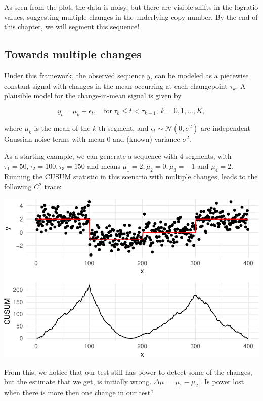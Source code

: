 \documentclass[
  letterpaper,
  DIV=11,
  numbers=noendperiod]{scrreprt}
\begin{document}
As seen from the plot, the data is noisy, but there are visible shifts
in the logratio values, suggesting multiple changes in the underlying
copy number. By the end of this chapter, we will segment this sequence!

\subsection{Towards multiple changes}\label{towards-multiple-changes}

Under this framework, the observed sequence \(y_t\) can be modeled as a
piecewise constant signal with changes in the mean occurring at each
changepoint \(\tau_k\). A plausible model for the change-in-mean signal
is given by

\[
y_t = \mu_k + \epsilon_t, \quad \text{for} \ \tau_k \leq t < \tau_{k+1}, \ k = 0, 1, \dots, K,
\]

where \(\mu_k\) is the mean of the \(k\)-th segment, and
\(\epsilon_t \sim \mathcal{N}(0, \sigma^2)\) are independent Gaussian
noise terms with mean 0 and (known) variance \(\sigma^2\).

As a starting example, we can generate a sequence with 4 segments, with
\(\tau_1 = 50, \tau_2 = 100, \tau_3 = 150\) and means
\(\mu_1 = 2, \mu_2 = 0, \mu_3 = -1\) and \(\mu_4 = 2\). Running the
CUSUM statistic in this scenario with multiple changes, leads to the
following \(C_\tau^2\) trace:

\includegraphics{3_multiple_changes_files/figure-pdf/unnamed-chunk-3-1.pdf}

From this, we notice that our test still has power to detect some of the
changes, but the estimate that we get, is initially wrong.
\(\Delta \mu = |\mu_1 - \mu_2|\). Is power lost when there is more then
one change in our test?
\end{document}

